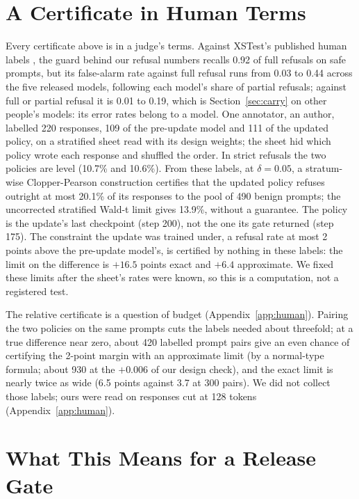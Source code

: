 \documentclass[letterpaper]{article} %
\newcommand{\SWT}{stratified Wald-t limit}
\begin{document}
\section{A Certificate in Human Terms}
\label{sec:human}

Every certificate above is in a judge's terms. Against XSTest's published human labels \citep{rottger2024xstest}, the
guard behind our refusal numbers recalls 0.92 of full refusals on safe prompts, but its false-alarm rate against full
refusal runs from 0.03 to 0.44 across the five released models, following each model's share of partial refusals;
against full or partial refusal it is 0.01 to 0.19, which is Section~\ref{sec:carry} on other people's models: its error rates
belong to a model. One annotator, an author, labelled 220 responses, 109 of the pre-update model and 111 of the updated policy, on a
stratified sheet read with its design weights; the sheet hid which policy wrote each response and shuffled the order. In strict refusals the two policies are level (10.7\% and 10.6\%).
From these labels, at $\delta=0.05$, a stratum-wise Clopper-Pearson construction certifies that the updated policy
refuses outright at most 20.1\% of its responses to the pool of 490 benign prompts; the uncorrected \SWT{} gives 13.9\%, without a
guarantee. The policy is the update's last checkpoint (step 200), not the one its gate returned (step 175). The constraint the update was trained under, a refusal rate at most 2 points above the pre-update model's,
is certified by nothing in these labels: the limit on the difference is $+16.5$ points exact and $+6.4$ approximate. We
fixed these limits after the sheet's rates were known, so this is a computation, not a registered test.

The relative certificate is a question of budget (Appendix~\ref{app:human}). Pairing the two policies on the same prompts
cuts the labels needed about threefold; at a true difference near zero, about 420 labelled prompt pairs give an even
chance of certifying the 2-point margin with an approximate limit (by a normal-type formula; about 930 at the $+0.006$ of our design check), and the exact limit is nearly twice as wide (6.5 points against 3.7 at 300 pairs). We did not collect those labels; ours were read on responses cut at 128 tokens (Appendix~\ref{app:human}).

\section{What This Means for a Release Gate}
\label{sec:gate}
\end{document}
